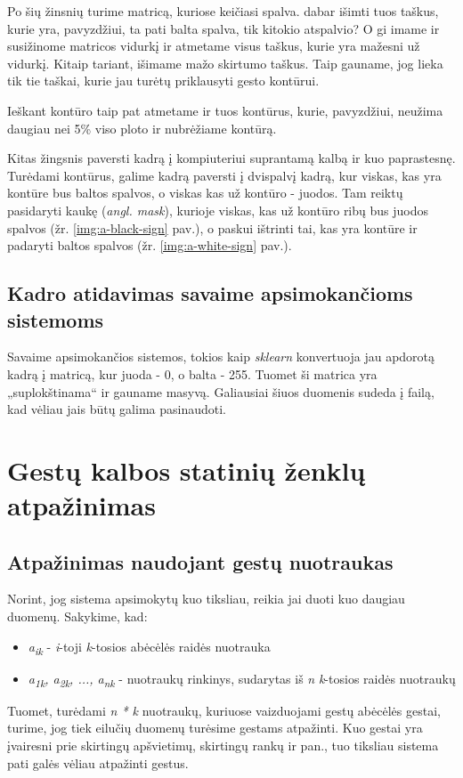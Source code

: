 \documentclass{VUMIFInfKursinis}
\begin{document}
Po šių žinsnių turime matricą, kuriose keičiasi spalva. dabar išimti tuos taškus, kurie yra, pavyzdžiui, ta pati balta spalva, tik kitokio atspalvio? O gi imame ir susižinome matricos vidurkį ir atmetame visus taškus, kurie yra mažesni už vidurkį. Kitaip tariant, išimame mažo skirtumo taškus. Taip gauname, jog lieka tik tie taškai, kurie jau turėtų priklausyti gesto kontūrui. 

Ieškant kontūro taip pat atmetame ir tuos kontūrus, kurie, pavyzdžiui, neužima daugiau nei 5\% viso ploto ir nubrėžiame kontūrą.

Kitas žingsnis paversti kadrą į kompiuteriui suprantamą kalbą ir kuo paprastesnę. Turėdami kontūrus, galime kadrą paversti į dvispalvį kadrą, kur viskas, kas yra kontūre bus baltos spalvos, o viskas kas už kontūro - juodos. Tam reiktų pasidaryti kaukę (\textit{angl. mask}), kurioje viskas, kas už kontūro ribų bus juodos spalvos (žr. \ref{img:a-black-sign} pav.), o paskui ištrinti tai, kas yra kontūre ir padaryti baltos spalvos (žr. \ref{img:a-white-sign} pav.).

\subsection{Kadro atidavimas savaime apsimokančioms sistemoms}
Savaime apsimokančios sistemos, tokios kaip \textit{sklearn} konvertuoja jau apdorotą kadrą į matricą, kur juoda - 0, o balta - 255. Tuomet ši matrica yra „suplokštinama“ ir gauname masyvą. Galiausiai šiuos duomenis sudeda į failą, kad vėliau jais būtų galima pasinaudoti.


\section{Gestų kalbos statinių ženklų atpažinimas}
\subsection{Atpažinimas naudojant gestų nuotraukas}
Norint, jog sistema apsimokytų kuo tiksliau, reikia jai duoti kuo daugiau duomenų. Sakykime, kad:
\begin{itemize}
	\item\textit{a\textsubscript{ik}} - \textit{i}-toji \textit{k}-tosios abėcėlės raidės nuotrauka 
	\item\textit{a\textsubscript{1k}, a\textsubscript{2k}, ..., a\textsubscript{nk}} - nuotraukų rinkinys, sudarytas iš \textit{n} \textit{k}-tosios raidės nuotraukų
\end{itemize}
Tuomet, turėdami \textit{n * k} nuotraukų, kuriuose vaizduojami gestų abėcėlės gestai, turime, jog tiek eilučių duomenų turėsime gestams atpažinti. Kuo gestai yra įvairesni prie skirtingų apšvietimų, skirtingų rankų ir pan., tuo tiksliau sistema pati galės vėliau atpažinti gestus.
\end{document}
